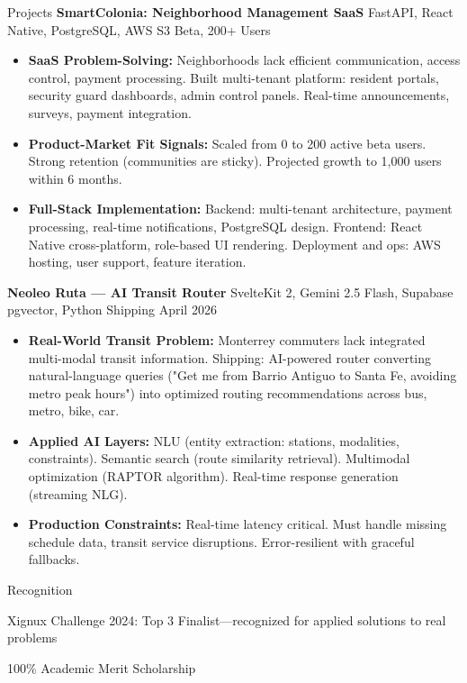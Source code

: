 \documentclass{resume}
\begin{document}
\begin{rSection}{Projects}
\textbf{SmartColonia: Neighborhood Management SaaS} {FastAPI, React Native, PostgreSQL, AWS S3} \hfill {Beta, 200+ Users}
\begin{itemize}
    \item \textbf{SaaS Problem-Solving:} Neighborhoods lack efficient communication, access control, payment processing. Built multi-tenant platform: resident portals, security guard dashboards, admin control panels. Real-time announcements, surveys, payment integration.
    \item \textbf{Product-Market Fit Signals:} Scaled from 0 to 200 active beta users. Strong retention (communities are sticky). Projected growth to 1,000 users within 6 months.
    \item \textbf{Full-Stack Implementation:} Backend: multi-tenant architecture, payment processing, real-time notifications, PostgreSQL design. Frontend: React Native cross-platform, role-based UI rendering. Deployment and ops: AWS hosting, user support, feature iteration.
\end{itemize}

\textbf{Neoleo Ruta — AI Transit Router} {SvelteKit 2, Gemini 2.5 Flash, Supabase pgvector, Python} \hfill {Shipping April 2026}
\begin{itemize}
    \item \textbf{Real-World Transit Problem:} Monterrey commuters lack integrated multi-modal transit information. Shipping: AI-powered router converting natural-language queries ("Get me from Barrio Antiguo to Santa Fe, avoiding metro peak hours") into optimized routing recommendations across bus, metro, bike, car.
    \item \textbf{Applied AI Layers:} NLU (entity extraction: stations, modalities, constraints). Semantic search (route similarity retrieval). Multimodal optimization (RAPTOR algorithm). Real-time response generation (streaming NLG).
    \item \textbf{Production Constraints:} Real-time latency critical. Must handle missing schedule data, transit service disruptions. Error-resilient with graceful fallbacks.
\end{itemize}

\end{rSection}

\begin{rSection}{Recognition}
\item Xignux Challenge 2024: Top 3 Finalist—recognized for applied solutions to real problems
\item 100\% Academic Merit Scholarship
\end{rSection}
\end{document}
